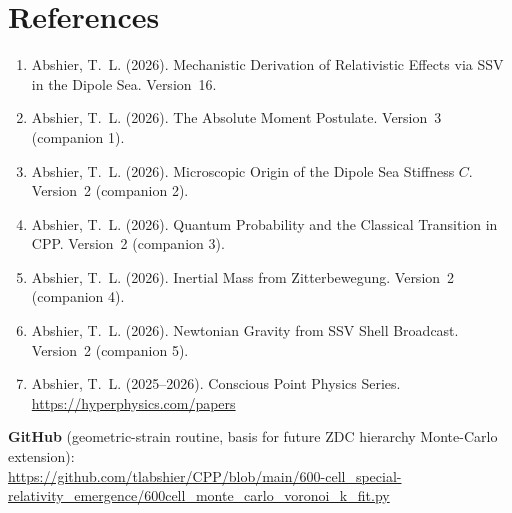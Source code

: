 \documentclass[12pt]{article}
\begin{document}
\section*{References}
\begin{enumerate}
\item Abshier, T.~L. (2026). Mechanistic Derivation of Relativistic Effects via SSV in the Dipole Sea. Version~16.
\item Abshier, T.~L. (2026). The Absolute Moment Postulate. Version~3 (companion 1).
\item Abshier, T.~L. (2026). Microscopic Origin of the Dipole Sea Stiffness \(C\). Version~2 (companion 2).
\item Abshier, T.~L. (2026). Quantum Probability and the Classical Transition in CPP. Version~2 (companion 3).
\item Abshier, T.~L. (2026). Inertial Mass from Zitterbewegung. Version~2 (companion 4).
\item Abshier, T.~L. (2026). Newtonian Gravity from SSV Shell Broadcast. Version~2 (companion 5).
\item Abshier, T.~L. (2025--2026). Conscious Point Physics Series. \url{https://hyperphysics.com/papers}
\end{enumerate}

\textbf{GitHub} (geometric-strain routine, basis for future ZDC hierarchy Monte-Carlo extension):\\
\url{https://github.com/tlabshier/CPP/blob/main/600-cell_special-relativity_emergence/600cell_monte_carlo_voronoi_k_fit.py}
\end{document}
